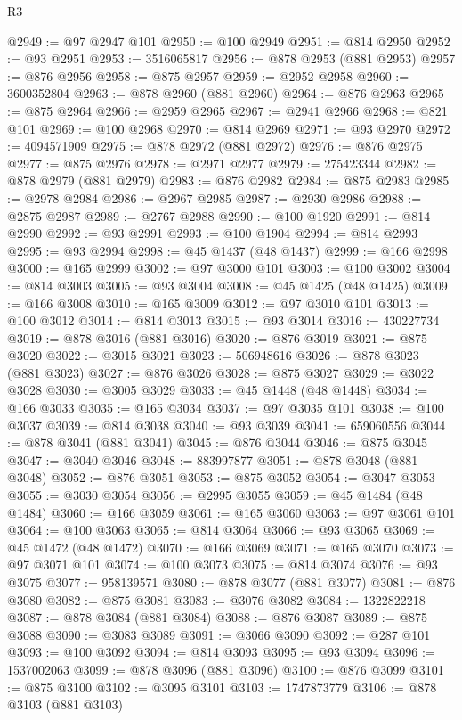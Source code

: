 \begin{lexlean}{R3}
\begin{coremodule}
@2949 := @97 @2947 @101
@2950 := @100 @2949
@2951 := @814 @2950
@2952 := @93 @2951
@2953 := 3516065817
@2956 := @878 @2953 (@881 @2953)
@2957 := @876 @2956
@2958 := @875 @2957
@2959 := @2952 @2958
@2960 := 3600352804
@2963 := @878 @2960 (@881 @2960)
@2964 := @876 @2963
@2965 := @875 @2964
@2966 := @2959 @2965
@2967 := @2941 @2966
@2968 := @821 @101
@2969 := @100 @2968
@2970 := @814 @2969
@2971 := @93 @2970
@2972 := 4094571909
@2975 := @878 @2972 (@881 @2972)
@2976 := @876 @2975
@2977 := @875 @2976
@2978 := @2971 @2977
@2979 := 275423344
@2982 := @878 @2979 (@881 @2979)
@2983 := @876 @2982
@2984 := @875 @2983
@2985 := @2978 @2984
@2986 := @2967 @2985
@2987 := @2930 @2986
@2988 := @2875 @2987
@2989 := @2767 @2988
@2990 := @100 @1920
@2991 := @814 @2990
@2992 := @93 @2991
@2993 := @100 @1904
@2994 := @814 @2993
@2995 := @93 @2994
@2998 := @45 @1437 (@48 @1437)
@2999 := @166 @2998
@3000 := @165 @2999
@3002 := @97 @3000 @101
@3003 := @100 @3002
@3004 := @814 @3003
@3005 := @93 @3004
@3008 := @45 @1425 (@48 @1425)
@3009 := @166 @3008
@3010 := @165 @3009
@3012 := @97 @3010 @101
@3013 := @100 @3012
@3014 := @814 @3013
@3015 := @93 @3014
@3016 := 430227734
@3019 := @878 @3016 (@881 @3016)
@3020 := @876 @3019
@3021 := @875 @3020
@3022 := @3015 @3021
@3023 := 506948616
@3026 := @878 @3023 (@881 @3023)
@3027 := @876 @3026
@3028 := @875 @3027
@3029 := @3022 @3028
@3030 := @3005 @3029
@3033 := @45 @1448 (@48 @1448)
@3034 := @166 @3033
@3035 := @165 @3034
@3037 := @97 @3035 @101
@3038 := @100 @3037
@3039 := @814 @3038
@3040 := @93 @3039
@3041 := 659060556
@3044 := @878 @3041 (@881 @3041)
@3045 := @876 @3044
@3046 := @875 @3045
@3047 := @3040 @3046
@3048 := 883997877
@3051 := @878 @3048 (@881 @3048)
@3052 := @876 @3051
@3053 := @875 @3052
@3054 := @3047 @3053
@3055 := @3030 @3054
@3056 := @2995 @3055
@3059 := @45 @1484 (@48 @1484)
@3060 := @166 @3059
@3061 := @165 @3060
@3063 := @97 @3061 @101
@3064 := @100 @3063
@3065 := @814 @3064
@3066 := @93 @3065
@3069 := @45 @1472 (@48 @1472)
@3070 := @166 @3069
@3071 := @165 @3070
@3073 := @97 @3071 @101
@3074 := @100 @3073
@3075 := @814 @3074
@3076 := @93 @3075
@3077 := 958139571
@3080 := @878 @3077 (@881 @3077)
@3081 := @876 @3080
@3082 := @875 @3081
@3083 := @3076 @3082
@3084 := 1322822218
@3087 := @878 @3084 (@881 @3084)
@3088 := @876 @3087
@3089 := @875 @3088
@3090 := @3083 @3089
@3091 := @3066 @3090
@3092 := @287 @101
@3093 := @100 @3092
@3094 := @814 @3093
@3095 := @93 @3094
@3096 := 1537002063
@3099 := @878 @3096 (@881 @3096)
@3100 := @876 @3099
@3101 := @875 @3100
@3102 := @3095 @3101
@3103 := 1747873779
@3106 := @878 @3103 (@881 @3103)

\end{coremodule}
\end{lexlean}
